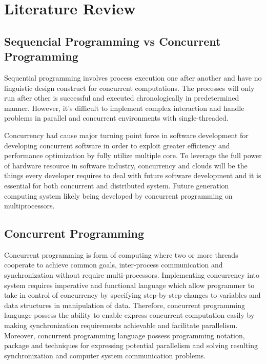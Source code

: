 \chapter{Literature Review} 

\label{Chapter2} 


\doublespacing


\section{Sequencial Programming vs Concurrent Programming}

Sequential programming involves process execution one after another \cite{control-structures} and have no linguistic design construct for concurrent computations. \cite{sequential-vs-concurrent} The processes will only run after other is successful and executed chronologically in predetermined manner. \cite{sequential-programming} However, it’s difficult to implement complex interaction and handle problems in parallel and concurrent environments with single-threaded. \cite{concurrency-revolution-in-sd} 

Concurrency had cause major turning point force in software development for developing concurrent software in order to exploit greater efficiency and performance optimization by fully utilize multiple core. To leverage the full power of hardware resource in software industry, concurrency and clouds will be the things every developer requires to deal with future software development and it is essential for both concurrent and distributed system.  \cite{concurrent-distributed-programming-in-future} Future generation computing system likely being developed by concurrent programming on multiprocessors. \cite{oop-concurrent} 

\section{Concurrent Programming}

Concurrent programming is form of computing where two or more threads cooperate to achieve common goals, inter-process communication and synchronization without require multi-processors. \cite{what-is-concurrent-programming} Implementing concurrency into system requires imperative and functional language which allow programmer to take in control of concurrency by specifying step-by-step changes to variables and data structures in manipulation of data. \cite{software-concurrency-revolution} Therefore, concurrent programming language possess the ability to enable express concurrent computation easily by making synchronization requirements achievable and facilitate parallelism. Moreover, concurrent programming language possess programming notation, package and techniques for expressing potential parallelism and solving resulting synchronization and computer system communication problems. \cite{notation-concurrent-programming}

